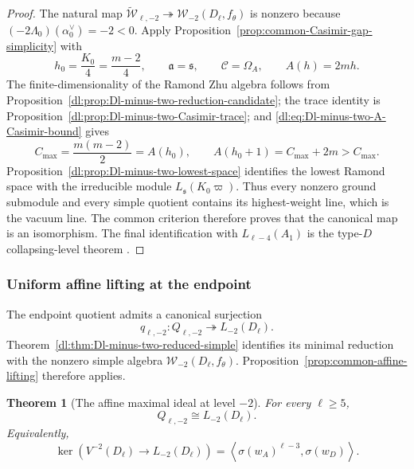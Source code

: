 \documentclass[11pt,reqno]{amsart}
\newtheorem{theorem}{Theorem}[section]
\theoremstyle{definition}
\theoremstyle{remark}
\begin{document}
\begin{proof}
The natural map
\(
 \widetilde{\mathcal W}_{\ell,-2}\twoheadrightarrow
 \mathcal W_{-2}(D_\ell,f_\theta)
\)
is nonzero because
\(( -2\Lambda_0)(\alpha_0^\vee)=-2<0\).
Apply Proposition~\ref{prop:common-Casimir-gap-simplicity} with
\begin{equation*}
 h_0=\frac{K_0}{4}=\frac{m-2}{4},
 \qquad
 \mathfrak a=\mathfrak s,
 \qquad
 \mathcal C=\Omega_A,
 \qquad
 A(h)=2mh.
\end{equation*}
The finite-dimensionality of the Ramond Zhu algebra follows from
Proposition~\ref{dl:prop:Dl-minus-two-reduction-candidate}; the trace
identity is Proposition~\ref{dl:prop:Dl-minus-two-Casimir-trace}; and
\eqref{dl:eq:Dl-minus-two-A-Casimir-bound} gives
\begin{equation*}
 C_{\max}=\frac{m(m-2)}2=A(h_0),
 \qquad
 A(h_0+1)=C_{\max}+2m>C_{\max}.
\end{equation*}
Proposition~\ref{dl:prop:Dl-minus-two-lowest-space} identifies the
lowest Ramond space with the irreducible module
\(L_{\mathfrak s}(K_0\varpi)\).  Thus every nonzero ground submodule and
every simple quotient contains its highest-weight line, which is the vacuum
line.  The common criterion therefore proves that the canonical map is an
isomorphism.  The final identification with \(L_{\ell-4}(A_1)\) is
the type-\(D\) collapsing-level theorem
\cite[Theorem~3.3 and Proposition~3.4]{AdamovicKacMosenederFrajriaPapiPerse2018}.
\end{proof}

\subsubsection{Uniform affine lifting at the endpoint}


The endpoint quotient admits a canonical surjection
\begin{equation*}
 q_{\ell,-2}:Q_{\ell,-2}\twoheadrightarrow L_{-2}(D_\ell).
\end{equation*}
Theorem~\ref{dl:thm:Dl-minus-two-reduced-simple} identifies its minimal
reduction with the nonzero simple algebra
$\mathcal W_{-2}(D_\ell,f_\theta)$.  Proposition~\ref{prop:common-affine-lifting}
therefore applies.

\begin{theorem}[The affine maximal ideal at level \(-2\)]
\label{dl:thm:Dl-minus-two-affine-maximal-ideal}
For every \(\ell\ge5\),
\begin{equation*}
  Q_{\ell,-2}\cong L_{-2}(D_\ell).
\end{equation*}
Equivalently,
\begin{equation*}
  \ker\!\left(
    V^{-2}(D_\ell)\longrightarrow L_{-2}(D_\ell)
  \right)
  =
  \left\langle
    \sigma(w_A)^{\ell-3},
    \sigma(w_D)
  \right\rangle.
\end{equation*}
\end{theorem}
\end{document}
